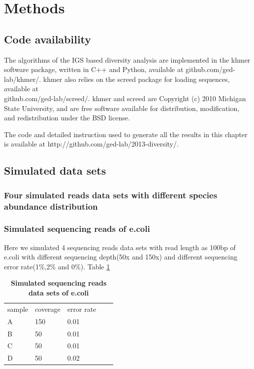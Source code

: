 \documentclass{article}
\begin{document}
\section{Methods}

\subsection{Code availability}
The algorithms of the IGS based diversity analysis are implemented 
 in the khmer software
package, written in C++ and Python, available at github.com/ged-lab/khmer/.
 khmer also relies on the screed package for loading
sequences, available at \\
github.com/ged-lab/screed/.
khmer and screed are Copyright (c) 2010 Michigan State University, and are free
software available for distribution, modification, and redistribution under the
BSD license.

The code and detailed instruction used to generate all the results in this 
chapter is available at
http://github.com/ged-lab/2013-diversity/. 


\subsection{Simulated data sets}

\subsubsection{Four simulated reads data sets with different species abundance distribution}

\subsubsection{Simulated sequencing reads of e.coli}

Here we simulated 4 sequencing reads data sets with read length as 100bp of e.coli with different sequencing depth(50x and 150x) and different sequencing error rate(1\%,2\% and 0\%). Table \ref{table:ecoli}

\begin{table}[h]
\caption{
\bf{Simulated sequencing reads data sets of e.coli}
}
\begin{tabular}{|l|l|l|ll}
\cline{1-3}
sample & coverage & error rate &  &  \\ \cline{1-3}
A      & 150      & 0.01       &  &  \\ \cline{1-3}
B      & 50       & 0.01       &  &  \\ \cline{1-3}
C      & 50       & 0.01       &  &  \\ \cline{1-3}
D      & 50       & 0.02       &  &  \\ \cline{1-3}
\end{tabular}
\label{table:ecoli}
\end{table}
\end{document}
